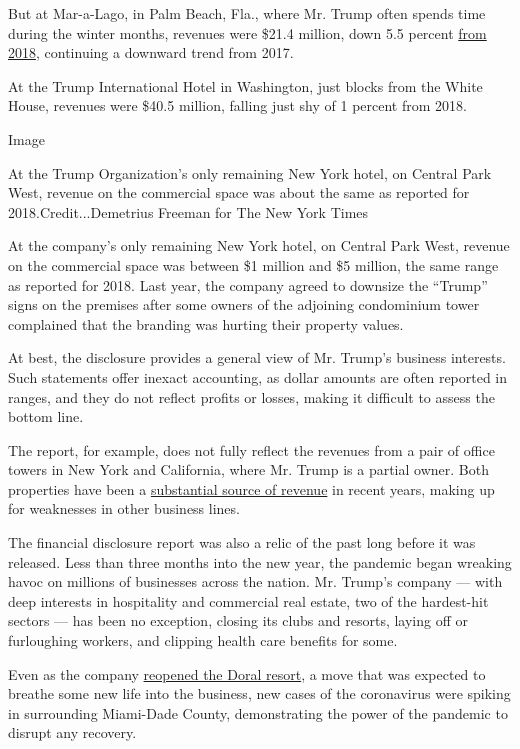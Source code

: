 But at Mar-a-Lago, in Palm Beach, Fla., where Mr. Trump often spends
time during the winter months, revenues were \$21.4 million, down 5.5
percent
\href{https://www.nytimes.com/2019/05/16/us/politics/trump-financial-disclosures.html}{from
2018}, continuing a downward trend from 2017.

At the Trump International Hotel in Washington, just blocks from the
White House, revenues were \$40.5 million, falling just shy of 1 percent
from 2018.

Image

At the Trump Organization's only remaining New York hotel, on Central
Park West, revenue on the commercial space was about the same as
reported for 2018.Credit...Demetrius Freeman for The New York Times

At the company's only remaining New York hotel, on Central Park West,
revenue on the commercial space was between \$1 million and \$5 million,
the same range as reported for 2018. Last year, the company agreed to
downsize the ``Trump'' signs on the premises after some owners of the
adjoining condominium tower complained that the branding was hurting
their property values.

At best, the disclosure provides a general view of Mr. Trump's business
interests. Such statements offer inexact accounting, as dollar amounts
are often reported in ranges, and they do not reflect profits or losses,
making it difficult to assess the bottom line.

The report, for example, does not fully reflect the revenues from a pair
of office towers in New York and California, where Mr. Trump is a
partial owner. Both properties have been a
\href{https://www.nytimes.com/2019/12/25/us/politics/trump-businesses.html}{substantial
source of revenue} in recent years, making up for weaknesses in other
business lines.

The financial disclosure report was also a relic of the past long before
it was released. Less than three months into the new year, the pandemic
began wreaking havoc on millions of businesses across the nation. Mr.
Trump's company --- with deep interests in hospitality and commercial
real estate, two of the hardest-hit sectors --- has been no exception,
closing its clubs and resorts, laying off or furloughing workers, and
clipping health care benefits for some.

Even as the company
\href{https://www.nytimes.com/2020/06/23/us/trump-doral-reopen-coronavirus.html}{reopened
the Doral resort}, a move that was expected to breathe some new life
into the business, new cases of the coronavirus were spiking in
surrounding Miami-Dade County, demonstrating the power of the pandemic
to disrupt any recovery.


